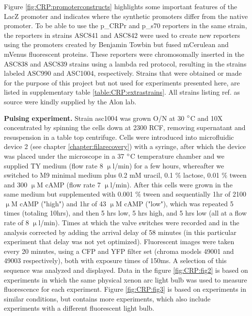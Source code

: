 %
Figure \ref{fig:CRP:promoterconstructs} highlights some important features of the LacZ promoter and indicates where the synthetic promoters differ from the native promoter.
%
To be able to use the p\_CRPr and p\_s70 reporters in the same strain, the reporters in strains ASC841 and ASC842 were used to create new reporters using the promoters created by Benjamin Towbin but fused mCerulean and mVenus fluorescent proteins.
These reporters were chromosomally inserted in the ASC838 and ASC839 strains using a lambda red protocol, resulting in the strains labeled ASC990 and ASC1004, respectively.
%
Strains that were obtained or made for the purpose of this project but not used for experiments presented here, are listed in supplementary table \ref{table:CRP:extrastrains}. All strains listing ref. \cite{Towbin2017} as source were kindly supplied by the Alon lab.

\textbf{Pulsing experiment.} Strain asc1004 was grown O/N at 30 $\degree$C and 10X concentrated by spinning the cells down at 2300 RCF, removing supernatant and resuspension in a table top centrifuge.
Cells were introduced into microfluidic device 2 (see chapter \ref{chapter:filarecovery}) with a syringe, after which the device was placed under the microscope in a 37 $\degree$C temperature chamber and we supplied TY medium (flow rate 8 $\upmu$l/min) for a few hours, whereafter we switched to M9 minimal medium plus 0.2 mM uracil, 0.1 $\%$ lactose, 0.01 $\%$ tween and 300 $\upmu$M cAMP (flow rate 7 $\upmu$l/min).
After this cells were grown in the same medium but supplemented with 0.001 $\%$ tween and sequentially 1hr of 2100 $\upmu$M cAMP ("high") and 1hr of 43 $\upmu$M cAMP ("low"), which was repeated 5 times (totaling 10hrs), and then 5 hrs low, 5 hrs high, and 5 hrs low (all at a flow rate of 8 $\upmu$l/min). 
Times at which the valve switches were recorded and in the analysis corrected by adding the arrival delay of 58 minutes (in this particular experiment that delay was not yet optimized).
Fluorescent images were taken every 20 minutes, using a CFP and YFP filter set (chroma models 49001 and 49003 respectively), both with exposure times of 150ms.
A selection of this sequence was analyzed and displayed.  
Data in the figure \ref{fig:CRP:fig2} is based on experiments in which the same physical xenon arc light bulb was used to measure fluorescence for each experiment.
Figure \ref{fig:CRP:fig3} is based on experiments in similar conditions, but contains more experiments, which also include experiments with a different fluorescent light bulb.

